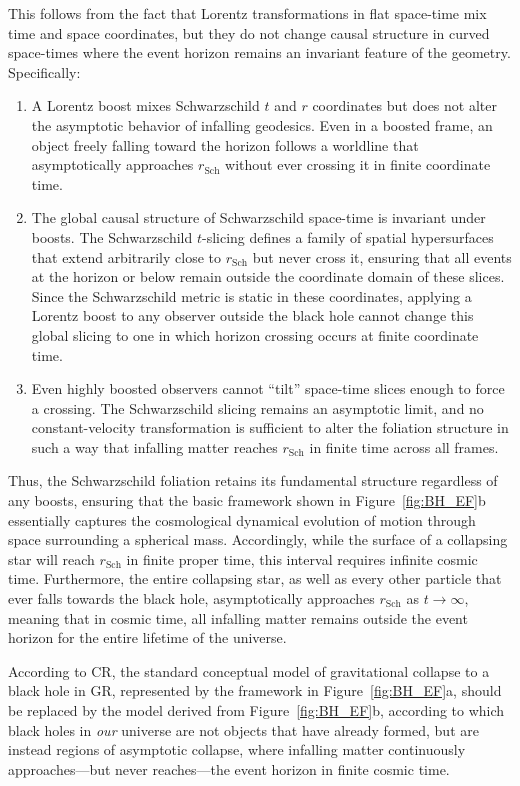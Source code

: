 \documentclass[aps,prd,reprint,superscriptaddress]{revtex4-2}
\begin{document}
This follows from the fact that Lorentz transformations in flat space-time mix time and space coordinates, but they do not change causal structure in curved space-times where the event horizon remains an invariant feature of the geometry. Specifically:
\begin{enumerate}
    \item A Lorentz boost mixes Schwarzschild $t$ and $r$ coordinates but does not alter the asymptotic behavior of infalling geodesics. Even in a boosted frame, an object freely falling toward the horizon follows a worldline that asymptotically approaches $r_{\mathrm{Sch}}$ without ever crossing it in finite coordinate time.
    \item The global causal structure of Schwarzschild space-time is invariant under boosts. The Schwarzschild $t$-slicing defines a family of spatial hypersurfaces that extend arbitrarily close to $r_{\mathrm{Sch}}$ but never cross it, ensuring that all events at the horizon or below remain outside the coordinate domain of these slices. Since the Schwarzschild metric is static in these coordinates, applying a Lorentz boost to any observer outside the black hole cannot change this global slicing to one in which horizon crossing occurs at finite coordinate time.
    \item Even highly boosted observers cannot ``tilt'' space-time slices enough to force a crossing. The Schwarzschild slicing remains an asymptotic limit, and no constant-velocity transformation is sufficient to alter the foliation structure in such a way that infalling matter reaches $r_{\mathrm{Sch}}$ in finite time across all frames.
\end{enumerate}

Thus, the Schwarzschild foliation retains its fundamental structure regardless of any boosts, ensuring that the basic framework shown in Figure~\ref{fig:BH_EF}b essentially captures the cosmological dynamical evolution of motion through space surrounding a spherical mass. Accordingly, while the surface of a collapsing star will reach $r_{\mathrm{Sch}}$ in finite proper time, this interval requires infinite cosmic time. Furthermore, the entire collapsing star, as well as every other particle that ever falls towards the black hole, asymptotically approaches 
$r_{\mathrm{Sch}}$ as $t\rightarrow\infty$, meaning that in cosmic time, all infalling matter remains outside the event horizon for the entire lifetime of the universe.

According to CR, the standard conceptual model of gravitational collapse to a black hole in GR, represented by the framework in Figure~\ref{fig:BH_EF}a, should be replaced by the model derived from Figure~\ref{fig:BH_EF}b, according to which black holes in \textit{our} universe are not objects that have already formed, but are instead regions of asymptotic collapse, where infalling matter continuously approaches---but never reaches---the event horizon in finite cosmic time.
\end{document}
